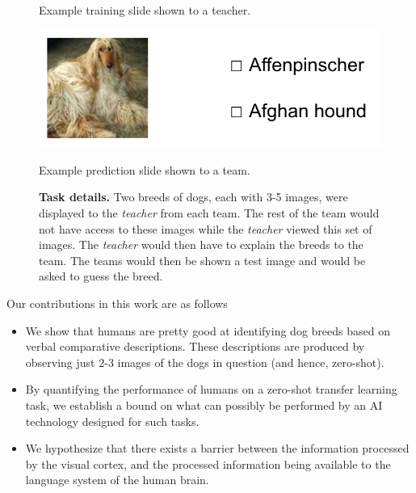 \documentclass[sigplan,10pt]{acmart}
\begin{document}
\begin{figure}[!htb]
    \caption{Example training slide shown to a teacher.}
    \label{fig:example-train}
\endminipage\hfill
{}%
    \includegraphics[width=1.2\textwidth]{images/example-test.png}
    \caption{Example prediction slide shown to a team.}
    \label{fig:example-test}
\endminipage
\caption{\textbf{Task details.} Two breeds of dogs, each with 3-5 images, were displayed to the \textit{teacher} from each team. The rest of the team would not have access to these images while the \textit{teacher} viewed this set of images. The \textit{teacher} would then have to explain the breeds to the team. The teams would then be shown a test image and would be asked to guess the breed.}
\end{figure}
Our contributions in this work are as follows
\begin{itemize}
    \item We show that humans are pretty good at identifying dog breeds based on verbal comparative descriptions. These descriptions are produced by observing just 2-3 images of the dogs in question (and hence, zero-shot).
    \item By quantifying the performance of humans on a zero-shot transfer learning task, we establish a bound on what can possibly be performed by an AI technology designed for such tasks.
    \item We hypothesize that there exists a barrier between the information processed by the visual cortex, and the processed information being available to the language system of the human brain.
\end{itemize}
\end{document}
